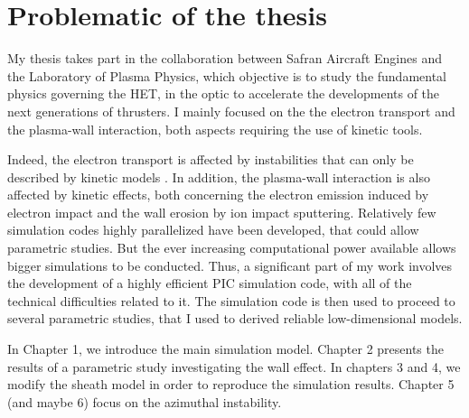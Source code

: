 
\section*{Problematic of the thesis}
\label{sec-problematic}

My thesis takes part in the collaboration between Safran Aircraft Engines and the Laboratory of Plasma Physics, which objective is to study the fundamental physics governing the \ac{HET}, in the optic to accelerate the developments of the next generations of thrusters.
I mainly focused on the the electron transport and the plasma-wall interaction,
both aspects requiring the use of kinetic tools.

Indeed, the electron transport is affected by instabilities that can only be described by kinetic models \citep{adam2008a,lafleur2016a}.
In addition, the plasma-wall interaction is also affected by kinetic effects, both concerning the electron emission induced by electron impact \citep{barral2003a,raitses2011,sydorenko2006} and the wall erosion by ion impact sputtering.
Relatively few simulation codes highly parallelized have been developed, that could allow parametric studies.
But the ever increasing computational power available allows bigger simulations to be conducted.
Thus, a significant part of my work involves the development of a highly efficient \ac{PIC} simulation code, with all of the technical difficulties related to it.
The simulation code is then used to proceed to several parametric studies, that I used to derived reliable low-dimensional models.


\vspace{1em}
In Chapter 1, we introduce the main simulation model.
Chapter 2 presents the results of a parametric study investigating the wall effect.
In chapters 3 and 4, we modify the sheath model in order to reproduce the simulation results.
Chapter 5 (and maybe 6) focus on the azimuthal instability.

